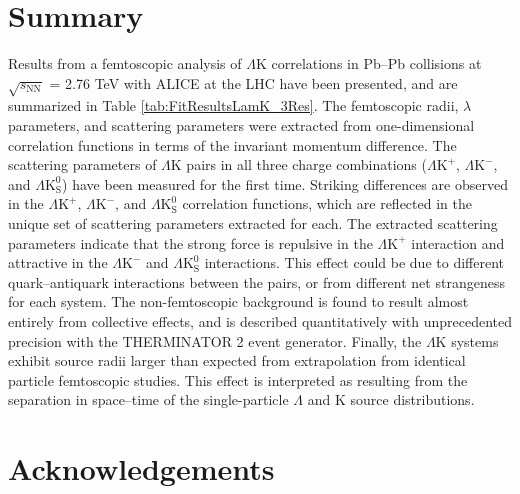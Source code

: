 \documentclass[ALICE,manyauthors]{cernphprep}
\newcommand{\ResultsDirBaseLamKch}{/home/jesse/Analysis/FemtoAnalysis/Results/Results_cLamcKch_20190319/}
\newcommand{\MomRes}{_MomResCrctn}%
\newcommand{\NonFlatBgdLamKch}{_NonFlatBgdCrctnLamK0LamKchPolynomial}
\newcommand{\ResNum}{_3Res}
\newcommand{\PrimMaxDecay}{_PrimMaxDecay10fm}
\newcommand{\ResMethod}{_UsingXiDataAndCoulombOnly}
\newcommand{\ParamFixAndShareLamKch}{_ShareLam_Dualie_ShareLam_ShareRadii}
\newcommand{\SaveNameModLamKch}{\MomRes\NonFlatBgdLamKch\ResNum\PrimMaxDecay\ResMethod\ParamFixAndShareLamKch}
\newcommand{\Lam}{$\Lambda$\xspace}
\newcommand{\LamK}{$\Lambda$K\xspace}
\newcommand{\LamKchP}{$\Lambda\mathrm{K^{+}}$\xspace}
\newcommand{\LamKchM}{$\Lambda\mathrm{K^{-}}$\xspace}
\newcommand{\LamKs}{$\Lambda\mathrm{K^{0}_{S}}$\xspace}
\begin{document}
\section{Summary}
\label{sec:Summary}



Results from a femtoscopic analysis of \LamK correlations in Pb--Pb collisions at $\sqrt{s_{\mathrm{NN}}}$ = 2.76 TeV with ALICE at the LHC have been presented, and are summarized in Table \ref{tab:FitResultsLamK_3Res}.
The femtoscopic radii, $\lambda$ parameters, and scattering parameters were extracted from one-dimensional correlation functions in terms of the invariant momentum difference.
The scattering parameters of \LamK pairs in all three charge combinations (\LamKchP, \LamKchM, and \LamKs) have been measured for the first time.
Striking differences are observed in the \LamKchP, \LamKchM, and \LamKs correlation functions, which are reflected in the unique set of scattering parameters extracted for each.
The extracted scattering parameters indicate that the strong force is repulsive in the \LamKchP interaction and attractive in the \LamKchM and \LamKs interactions.
This effect could be due to different quark--antiquark interactions between the pairs, or from different net strangeness for each system. 
The non-femtoscopic background is found to result almost entirely from collective effects, and is described quantitatively with unprecedented precision with the THERMINATOR 2 event generator.
Finally, the \LamK systems exhibit source radii larger than expected from extrapolation from identical particle femtoscopic studies.
This effect is interpreted as resulting from the separation in space--time of the single-particle \Lam and K source distributions.

\newenvironment{acknowledgement}{\relax}{\relax}
\begin{acknowledgement}
\section*{Acknowledgements}
\end{acknowledgement}
\end{document}
